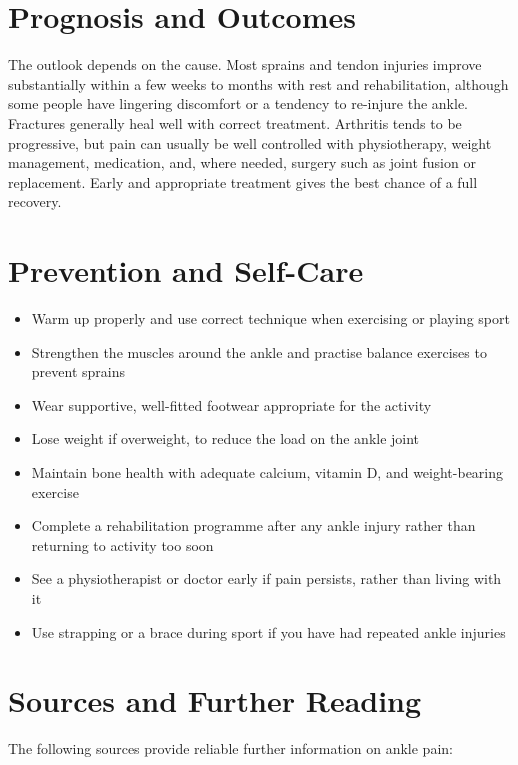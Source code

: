 \section*{Prognosis and Outcomes}
The outlook depends on the cause. Most sprains and tendon injuries improve substantially within a few weeks to months with rest and rehabilitation, although some people have lingering discomfort or a tendency to re-injure the ankle. Fractures generally heal well with correct treatment. Arthritis tends to be progressive, but pain can usually be well controlled with physiotherapy, weight management, medication, and, where needed, surgery such as joint fusion or replacement. Early and appropriate treatment gives the best chance of a full recovery.

\section*{Prevention and Self-Care}
\begin{itemize}
    \item Warm up properly and use correct technique when exercising or playing sport
    \item Strengthen the muscles around the ankle and practise balance exercises to prevent sprains
    \item Wear supportive, well-fitted footwear appropriate for the activity
    \item Lose weight if overweight, to reduce the load on the ankle joint
    \item Maintain bone health with adequate calcium, vitamin D, and weight-bearing exercise
    \item Complete a rehabilitation programme after any ankle injury rather than returning to activity too soon
    \item See a physiotherapist or doctor early if pain persists, rather than living with it
    \item Use strapping or a brace during sport if you have had repeated ankle injuries
\end{itemize}

\section*{Sources and Further Reading}
The following sources provide reliable further information on ankle pain:


